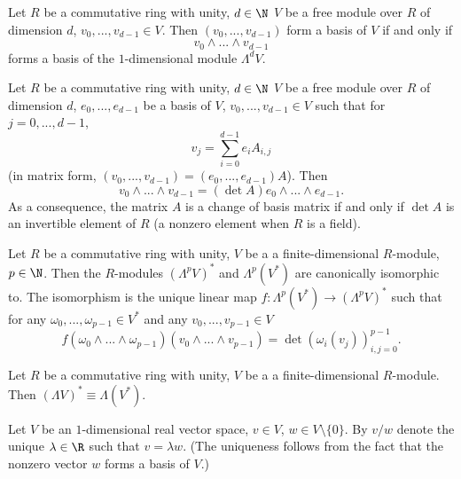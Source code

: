 \begin{proposition}
  Let
    $R$ be a commutative ring with unity,
    $d \in \N$
    $V$ be a free module over $R$ of dimension $d$,
    $v_0, ..., v_{d - 1} \in V$.
  Then $(v_0, ..., v_{d - 1})$ form a basis of $V$
  if and only if
  \begin{equation}
    v_0 \wedge ... \wedge v_{d - 1}
  \end{equation}
  forms a basis of the $1$-dimensional module $\Lambda^d V$.
\end{proposition}
\begin{proposition}
  Let
    $R$ be a commutative ring with unity,
    $d \in \N$
    $V$ be a free module over $R$ of dimension $d$,
    $e_0, ..., e_{d - 1}$ be a basis of $V$,
    $v_0, ..., v_{d - 1} \in V$ such that for $j = 0, ..., d - 1$,
  \begin{equation}
    v_j = \sum_{i = 0}^{d - 1} e_i A_{i, j}
  \end{equation}
  (in matrix form, $(v_0, ..., v_{d - 1}) = (e_0, ..., e_{d - 1}) A$).
  Then
  \begin{equation}
    v_0 \wedge ... \wedge v_{d - 1} = (\det A) e_0 \wedge ... \wedge e_{d - 1}.
  \end{equation}
  As a consequence, the matrix $A$ is a change of basis matrix if and only if
  $\det A$ is an invertible element of $R$
  (a nonzero element when $R$ is a field).
\end{proposition}
\begin{proposition}
  Let
    $R$ be a commutative ring with unity,
    $V$ be a a finite-dimensional $R$-module,
    $p \in \N$.
  Then the $R$-modules $(\Lambda^p V)^*$ and $\Lambda^p (V^*)$
  are canonically isomorphic to.
  The isomorphism is the unique linear map
  $f \colon \Lambda^p (V^*) \to (\Lambda^p V)^*$ such that
  for any $\omega_0, ..., \omega_{p - 1} \in V^*$
  and any $v_0, ..., v_{p - 1} \in V$
  \begin{equation}
    f(\omega_0 \wedge ... \wedge \omega_{p - 1})
    (v_0 \wedge ... \wedge v_{p - 1})
    = \det (\omega_i(v_j))_{i, j = 0}^{p - 1}.
  \end{equation}
\end{proposition}
\begin{corollary}
  Let
    $R$ be a commutative ring with unity,
    $V$ be a a finite-dimensional $R$-module.
  Then $(\Lambda V)^* \equiv \Lambda (V^*)$.
\end{corollary}
\begin{notation}
  Let
    $V$ be an $1$-dimensional real vector space,
    $v \in V$,
    $w \in V \setminus \{0\}$.
  By $v / w$ denote the unique $\lambda \in \R$ such that $v = \lambda w$.
  (The uniqueness follows from the fact that the nonzero vector $w$ forms a
  basis of $V$.)
\end{notation}
